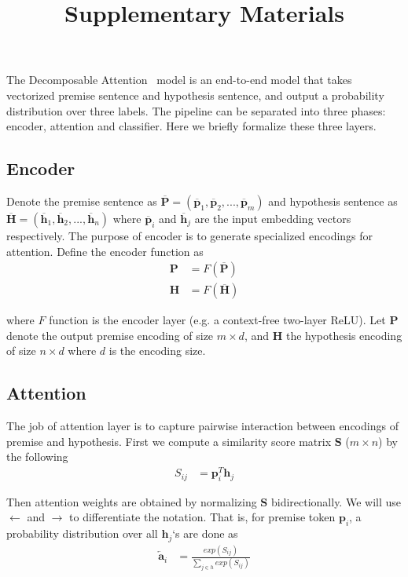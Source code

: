 \documentclass[review,journal]{vgtc}         %
\title{
Supplementary Materials
}
\begin{document}
\maketitle

The Decomposable Attention~\cite{parikh2016emnlp} model is an end-to-end model that takes vectorized premise sentence and hypothesis sentence, and output a probability distribution over three labels. The pipeline can be separated into three phases: encoder, attention and classifier. Here we briefly formalize these three layers.

\subsection{Encoder}
Denote the premise sentence as $\overline{\boldsymbol{P}} = (\overline{\boldsymbol{p}}_1, \overline{\boldsymbol{p}}_2, ..., \overline{\boldsymbol{p}}_m)$ and hypothesis sentence as $\overline{\boldsymbol{H}} = (\overline{\boldsymbol{h}}_1, \overline{\boldsymbol{h}}_2, ..., \overline{\boldsymbol{h}}_n)$ where $\overline{\boldsymbol{p}}_i$ and $\overline{\boldsymbol{h}}_j$ are the input embedding vectors respectively. The purpose of encoder is to generate specialized encodings for attention. Define the encoder function as
\begin{align}
  \boldsymbol{P} &= F(\overline{\boldsymbol{P}})\\
  \boldsymbol{H} &= F(\overline{\boldsymbol{H}})
\end{align}

where $F$ function is the encoder layer (e.g. a context-free two-layer ReLU). Let $\boldsymbol{P}$ denote the output premise encoding of size $m \times d$, and $\boldsymbol{H}$ the hypothesis encoding of size $n \times d$ where $d$ is the encoding size.

\subsection{Attention} \label{sec:att}
The job of attention layer is to capture pairwise interaction between encodings of premise and hypothesis. First we compute a similarity score matrix $\boldsymbol{S}$ ($m \times n$) by the following
\begin{align}
  S_{ij} &= \boldsymbol{p}_i ^T \boldsymbol{h}_j
\end{align}

Then attention weights are obtained by normalizing $\boldsymbol{S}$ bidirectionally. We will use $\leftarrow$ and $\rightarrow$ to differentiate the notation. That is, for premise token $\boldsymbol{p}_i$, a probability distribution over all $\boldsymbol{h}_j$`s are done as
\begin{align}
  \overleftarrow{\boldsymbol{a}}_i &= \frac{exp(S_{ij})}{\sum_{j \in h} exp(S_{ij})}
\end{align}
\end{document}

